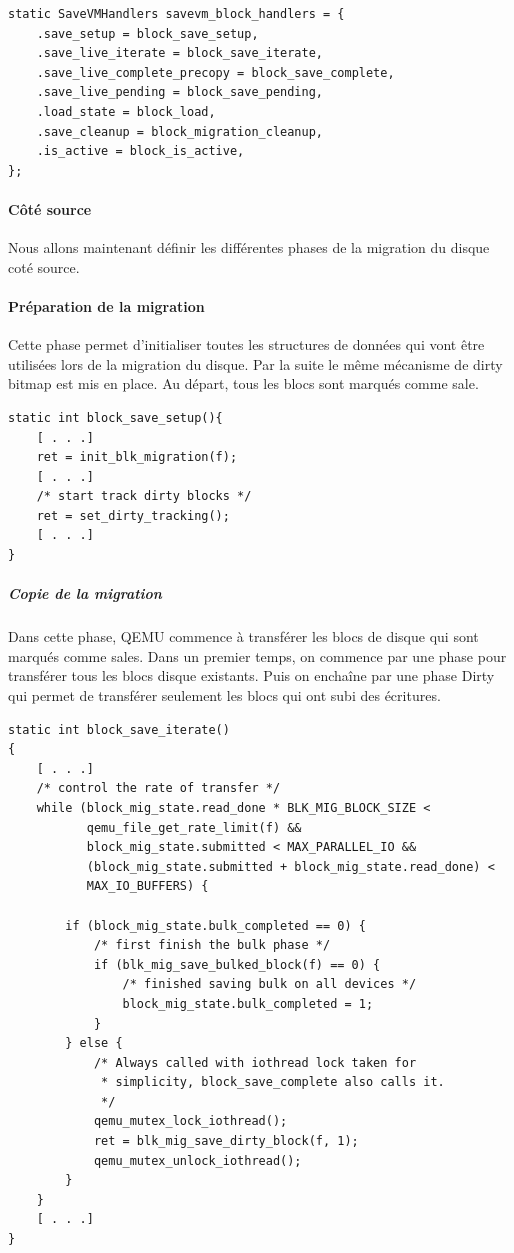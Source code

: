\begin{lstlisting}[caption={SaveVMHandlers responsable de la migration du disque},captionpos=b]
static SaveVMHandlers savevm_block_handlers = {
    .save_setup = block_save_setup,
    .save_live_iterate = block_save_iterate,
    .save_live_complete_precopy = block_save_complete,
    .save_live_pending = block_save_pending,
    .load_state = block_load,
    .save_cleanup = block_migration_cleanup,
    .is_active = block_is_active,
};
\end{lstlisting}

\paragraph*{Côté source}
Nous allons maintenant définir les différentes phases de la migration du disque coté source.

\paragraph*{Préparation de la migration}
Cette phase permet d'initialiser toutes les structures de données qui vont être utilisées lors de la migration du disque.
Par la suite le même mécanisme de dirty bitmap est mis en place.
Au départ, tous les blocs sont marqués comme sale.

\begin{lstlisting}[caption={Code responsable de la phase de préparation},captionpos=b]
static int block_save_setup(){
    [ . . .]
    ret = init_blk_migration(f);
    [ . . .]
    /* start track dirty blocks */
    ret = set_dirty_tracking();
    [ . . .]
}
\end{lstlisting}


\subparagraph*{Copie de la migration}
Dans cette phase, QEMU commence à transférer les blocs de disque qui sont marqués comme sales.
Dans un premier temps, on commence par une phase pour transférer tous les blocs disque existants.
Puis on enchaîne par une phase Dirty qui permet de transférer seulement les blocs qui ont subi des écritures.

\begin{lstlisting}[caption={Code responsable de la phase de copie},captionpos=b]
static int block_save_iterate()
{
    [ . . .]
    /* control the rate of transfer */
    while (block_mig_state.read_done * BLK_MIG_BLOCK_SIZE <
           qemu_file_get_rate_limit(f) &&
           block_mig_state.submitted < MAX_PARALLEL_IO &&
           (block_mig_state.submitted + block_mig_state.read_done) <
           MAX_IO_BUFFERS) {

        if (block_mig_state.bulk_completed == 0) {
            /* first finish the bulk phase */
            if (blk_mig_save_bulked_block(f) == 0) {
                /* finished saving bulk on all devices */
                block_mig_state.bulk_completed = 1;
            }
        } else {
            /* Always called with iothread lock taken for
             * simplicity, block_save_complete also calls it.
             */
            qemu_mutex_lock_iothread();
            ret = blk_mig_save_dirty_block(f, 1);
            qemu_mutex_unlock_iothread();
        }
    }
    [ . . .]
}
\end{lstlisting}

